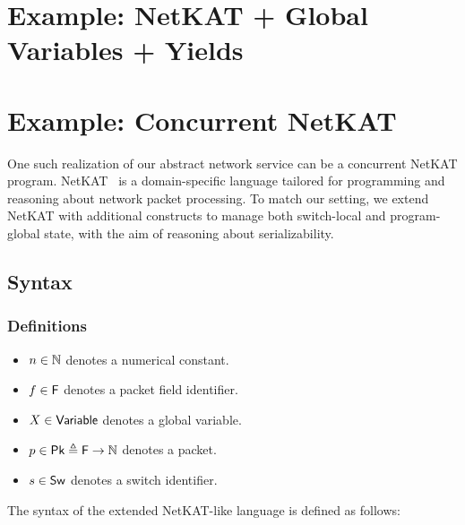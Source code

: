 \section{Example: NetKAT + Global Variables + Yields}
\label{sec:exampleNetKat}

\section{Example: Concurrent NetKAT}

One such realization of our abstract network service can be a concurrent NetKAT 
program. 
%
NetKAT~\cite{AnDoGuJeKoScWa14} is a domain-specific language tailored for 
programming and reasoning 
about network packet processing. 
%
To match our setting, we extend NetKAT with additional 
constructs to manage both switch-local and program-global state, with the aim 
of reasoning about serializability.



\subsection{Syntax}

\subsubsection{Definitions}

\begin{itemize}
	\item \( n \in \mathbb{N} \) denotes a numerical constant.
	\item \( f \in \mathsf{F} \) denotes a packet field identifier.
	\item \( X \in \mathsf{Variable} \) denotes a global variable.
	\item \( p \in \mathsf{Pk} \triangleq \mathsf{F} \to \mathbb{N} \) denotes a packet.
	\item \( s \in \mathsf{Sw} \) denotes a switch identifier.
	
	
\end{itemize}


The syntax of the extended NetKAT-like language is defined as follows:

